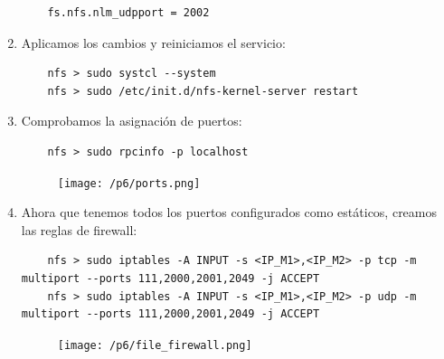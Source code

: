 \documentclass[12pt,spanish]{article}
\begin{document}
\begin{enumerate}
\begin{lstlisting}
	fs.nfs.nlm_udpport = 2002
	\end{lstlisting}
	\item Aplicamos los cambios y reiniciamos el servicio:
	\begin{lstlisting}
	nfs > sudo systcl --system
	nfs > sudo /etc/init.d/nfs-kernel-server restart
	\end{lstlisting}
	\item Comprobamos la asignación de puertos:
	\begin{lstlisting}
	nfs > sudo rpcinfo -p localhost
	\end{lstlisting}
	\begin{figure}[H]
		\centering
		\texttt{[image: /p6/ports.png]}
	\end{figure}
	\item Ahora que tenemos todos los puertos configurados como estáticos, creamos las reglas de firewall:
	\begin{lstlisting}
	nfs > sudo iptables -A INPUT -s <IP_M1>,<IP_M2> -p tcp -m multiport --ports 111,2000,2001,2049 -j ACCEPT
	nfs > sudo iptables -A INPUT -s <IP_M1>,<IP_M2> -p udp -m multiport --ports 111,2000,2001,2049 -j ACCEPT
	\end{lstlisting}
	\begin{figure}[H]
		\centering
		\texttt{[image: /p6/file\_firewall.png]}
	\end{figure}
\end{enumerate}
\end{document}
